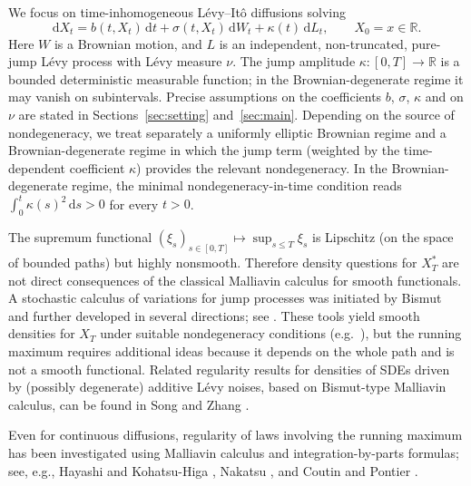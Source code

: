 \documentclass[11pt]{article}
\newcommand{\R}{\mathbb{R}}
\newcommand{\1}{\mathbf{1}}
\newcommand{\dd}{\mathrm{d}}
\newcommand{\dt}{\,\dd t}
\newcommand{\Xstar}{X^{\ast}}
\theoremstyle{plain}
\theoremstyle{definition}
\theoremstyle{remark}
\begin{document}
We focus on time-inhomogeneous L\'evy--It\^o diffusions solving
\begin{equation}\label{eq:SDE-general}
\dd X_t=b(t,X_t)\dt+\sigma(t,X_t)\,\dd W_t+\kappa(t)\,\dd L_t,\qquad X_0=x\in\R.
\end{equation}
Here $W$ is a Brownian motion, and $L$ is an independent, non-truncated, pure-jump L\'evy process with L\'evy measure $\nu$.
The jump amplitude $\kappa:[0,T]\to\R$ is a bounded deterministic measurable function; in the Brownian-degenerate regime it may vanish on subintervals.
Precise assumptions on the coefficients $b$, $\sigma$, $\kappa$ and on $\nu$ are stated in Sections~\ref{sec:setting} and~\ref{sec:main}. Depending on the source of nondegeneracy, we treat separately a uniformly elliptic Brownian regime and a Brownian-degenerate regime in which the jump term (weighted by the time-dependent coefficient $\kappa$) provides the relevant nondegeneracy.
In the Brownian-degenerate regime, the minimal nondegeneracy-in-time condition reads $\int_0^t\kappa(s)^2\,\dd s>0$ for every $t>0$.

The supremum functional $(\xi_s)_{s\in[0,T]}\mapsto \sup_{s\le T}\xi_s$ is Lipschitz (on the space of bounded paths) but highly nonsmooth.
Therefore density questions for $\Xstar_T$ are not direct consequences of the classical Malliavin calculus for smooth functionals.
A stochastic calculus of variations for jump processes was initiated by Bismut \cite{Bismut1983} and further developed in several directions;
see \cite{Bichteler1987,IshikawaKunita2006,Ishikawa2023,Nualart2006}.
These tools yield smooth densities for $X_T$ under suitable nondegeneracy conditions (e.g.\ \cite{BallyClement2011,Cass2009,Picard1996}),
but the running maximum requires additional ideas because it depends on the whole path and is not a smooth functional.
Related regularity results for densities of SDEs driven by (possibly degenerate) additive L\'evy noises, based on Bismut-type Malliavin calculus, can be found in Song and Zhang \cite{SongZhang2015}.

Even for continuous diffusions, regularity of laws involving the running maximum has been investigated using Malliavin calculus
and integration-by-parts formulas; see, e.g., Hayashi and Kohatsu-Higa \cite{HayashiKohatsuHiga2013},
Nakatsu \cite{Nakatsu2016,Nakatsu2019}, and Coutin and Pontier \cite{CoutinPontier2019,CoutinPontier2023}.
\end{document}
